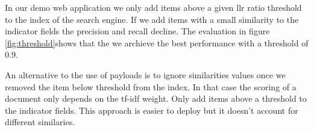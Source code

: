In our demo web application we only add items above a given \gls{llr} ratio threshold to the index of the search engine. If we add items with a small similarity to the indicator fields the precision and recall decline. The evaluation in figure \ref{fig:threshold}shows that the we archieve the best performance with a threshold of 0.9.

An alternative to the use of payloads is to ignore similarities values once we removed the item below threshold from the index. In that case the scoring of a document only depends on the tf-idf weight. Only add items above a threshold to the indicator fields. This approach is easier to deploy but it doesn't account for different similaries. 